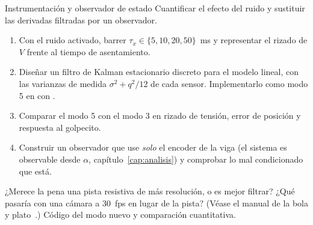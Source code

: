 \label{pr:obs}
\begin{practica}{Instrumentación y observador de estado}
\objetivos Cuantificar el efecto del ruido y sustituir las derivadas filtradas por un observador.
\procedimiento
\begin{enumerate}
  \item Con el ruido activado, barrer $\tau_x\in\{5,10,20,50\}$~ms y representar el rizado de $V$ frente al tiempo de asentamiento.
  \item Diseñar un filtro de Kalman estacionario discreto para el modelo lineal, con las varianzas de medida $\sigma^2+q^2/12$ de cada sensor. Implementarlo como modo 5 en  con .
  \item Comparar el modo 5 con el modo 3 en rizado de tensión, error de posición y respuesta al golpecito.
  \item Construir un observador que use \emph{solo} el encoder de la viga (el sistema es observable desde $\alpha$, capítulo~\ref{cap:analisis}) y comprobar lo mal condicionado que está.
\end{enumerate}
\preguntas ¿Merece la pena una pista resistiva de más resolución, o es mejor filtrar? ¿Qué pasaría con una cámara a \SI{30}{fps} en lugar de la pista? (Véase el manual de la bola y plato~\cite{placa}.)
\entregables Código del modo nuevo y comparación cuantitativa.
\end{practica}
